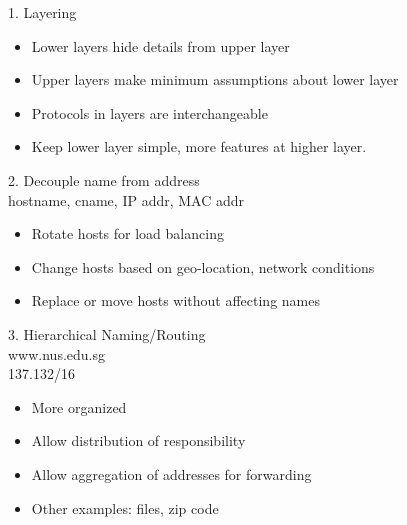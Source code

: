 \begin{cf}
	1. Layering
\end{cf}




\begin{cf}{\small
	\begin{itemize}
	\item Lower layers hide details from upper layer
	\item Upper layers make minimum assumptions about lower layer
	\item Protocols in layers are interchangeable
	\item Keep lower layer simple, more features at higher layer.
	\end{itemize}
}
\end{cf}

\begin{cf}
	2. Decouple name from address\\
	\vspace{1cm}
	hostname, cname, IP addr, MAC addr
\end{cf}

\begin{cf}{\small
	\begin{itemize}
	\item Rotate hosts for load balancing
	\item Change hosts based on geo-location, network conditions
  \item Replace or move hosts without affecting names
	\end{itemize}
}
\end{cf}

\begin{cf}
	3. Hierarchical Naming/Routing\\
	\vspace{1cm}
	www.nus.edu.sg\\
	137.132/16
\end{cf}


\begin{cf}{\small
	\begin{itemize}
	\item More organized
	\item Allow distribution of responsibility
  \item Allow aggregation of addresses for forwarding
	\item Other examples: files, zip code
	\end{itemize}
}
\end{cf}

